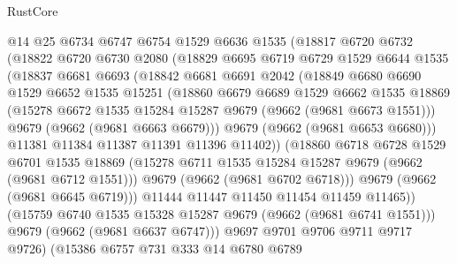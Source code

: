 \begin{lexlean}{RustCore}
\begin{coremodule}
              @14
              @25
              @6734
              @6747
              @6754
              @1529
              @6636
              @1535
              (@18817
                @6720
                @6732
                (@18822
                  @6720
                  @6730
                  @2080
                  (@18829
                    @6695
                    @6719
                    @6729
                    @1529
                    @6644
                    @1535
                    (@18837
                      @6681
                      @6693
                      (@18842
                        @6681
                        @6691
                        @2042
                        (@18849
                          @6680
                          @6690
                          @1529
                          @6652
                          @1535
                          @15251
                          (@18860
                            @6679
                            @6689
                            @1529
                            @6662
                            @1535
                            @18869
                            (@15278 @6672 @1535 @15284 @15287 @9679 (@9662 (@9681 @6673 @1551)))
                            @9679
                            (@9662 (@9681 @6663 @6679)))
                          @9679
                          (@9662 (@9681 @6653 @6680)))
                        @11381
                        @11384
                        @11387
                        @11391
                        @11396
                        @11402))
                    (@18860
                      @6718
                      @6728
                      @1529
                      @6701
                      @1535
                      @18869
                      (@15278 @6711 @1535 @15284 @15287 @9679 (@9662 (@9681 @6712 @1551)))
                      @9679
                      (@9662 (@9681 @6702 @6718)))
                    @9679
                    (@9662 (@9681 @6645 @6719)))
                  @11444
                  @11447
                  @11450
                  @11454
                  @11459
                  @11465))
              (@15759 @6740 @1535 @15328 @15287 @9679 (@9662 (@9681 @6741 @1551)))
              @9679
              (@9662 (@9681 @6637 @6747)))
            @9697
            @9701
            @9706
            @9711
            @9717
            @9726)
          (@15386
            @6757
            @731
            @333
            @14
            @6780
            @6789

\end{coremodule}
\end{lexlean}
